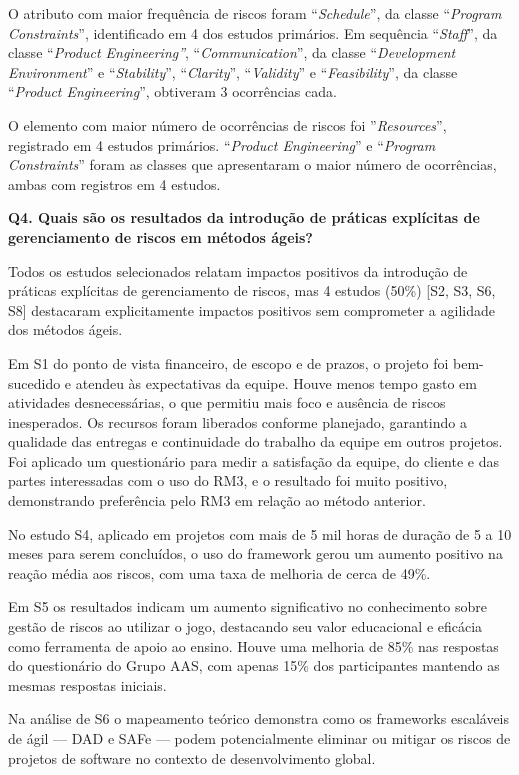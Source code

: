 \documentclass[
	12pt,
	openright,
	twoside,
	a4paper,
	english,
	brazil
	]{abntex2}
\begin{document}
O atributo com maior frequência de riscos foram “\textit{Schedule}”, da classe “\textit{Program Constraints}”, identificado em 4 dos estudos primários. Em sequência “\textit{Staff}”, da classe “\textit{Product Engineering”}, “\textit{Communication}”, da classe “\textit{Development Environment}” e “\textit{Stability}”, “\textit{Clarity}”, “\textit{Validity}” e “\textit{Feasibility}”, da classe “\textit{Product Engineering}”, obtiveram 3 ocorrências cada.

O elemento com maior número de ocorrências de riscos foi ”\textit{Resources}”, registrado em 4 estudos primários. “\textit{Product Engineering}” e “\textit{Program Constraints}” foram as classes que apresentaram o maior número de ocorrências, ambas com registros em 4 estudos.

\textbf{Q4. Quais são os resultados da introdução de práticas explícitas de gerenciamento de riscos em métodos ágeis?}

Todos os estudos selecionados relatam impactos positivos da introdução de práticas explícitas de gerenciamento de riscos, mas 4 estudos (50\%) [S2, S3, S6, S8] destacaram explicitamente impactos positivos sem comprometer a agilidade dos métodos ágeis.

Em S1 do ponto de vista financeiro, de escopo e de prazos, o projeto foi bem-sucedido e atendeu às expectativas da equipe. Houve menos tempo gasto em atividades desnecessárias, o que permitiu mais foco e ausência de riscos inesperados. Os recursos foram liberados conforme planejado, garantindo a qualidade das entregas e continuidade do trabalho da equipe em outros projetos. Foi aplicado um questionário para medir a satisfação da equipe, do cliente e das partes interessadas com o uso do RM3, e o resultado foi muito positivo, demonstrando preferência pelo RM3 em relação ao método anterior.

No estudo S4, aplicado em projetos com mais de 5 mil horas de duração de 5 a 10 meses para serem concluídos, o uso do framework gerou um aumento positivo na reação média aos riscos, com uma taxa de melhoria de cerca de 49\%.

Em S5 os resultados indicam um aumento significativo no conhecimento sobre gestão de riscos ao utilizar o jogo, destacando seu valor educacional e eficácia como ferramenta de apoio ao ensino. Houve uma melhoria de 85\% nas respostas do questionário do Grupo AAS, com apenas 15\% dos participantes mantendo as mesmas respostas iniciais.

Na análise de S6 o mapeamento teórico demonstra como os frameworks escaláveis de ágil — DAD e SAFe — podem potencialmente eliminar ou mitigar os riscos de projetos de software no contexto de desenvolvimento global.
\end{document}
